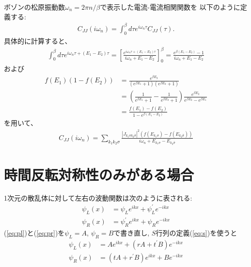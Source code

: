 \documentclass[10pt,a4j]{jarticle}
\begin{document}
ボゾンの松原振動数$\omega_n = 2\pi n/\beta$で表示した電流-電流相関関数を
以下のように定義する:
\begin{align}
C_{JJ}(i \omega_n) = \int_0^\beta d\tau e^{i\omega_n \tau} C_{JJ}(\tau). 
\end{align}
具体的に計算すると、
\begin{align}
\int_0^{\beta} d\tau e^{i\omega_n \tau + (E_1-E_2)\tau}
= \left[ \frac{e^{i\omega_n \tau + (E_1-E_2)\tau}}{i\omega_n + E_1-E_2} \right]_0^\beta
= \frac{e^{\beta (E_1-E_2)}-1}{i\omega_n + E_1-E_2}
\end{align}
および
\begin{align}
f(E_1) (1-f(E_2)) &= \frac{e^{\beta E_2}}{(e^{\beta E_1}+1)(e^{\beta E_2}+1)} \nonumber \\
&= \left(\frac{1}{e^{\beta E_1}+1} - \frac{1}{e^{\beta E_2}+1}\right) \frac{e^{\beta E_2}}{e^{\beta E_2} - e^{\beta E_1}}
\nonumber \\
&= \frac{f(E_1) - f(E_2)}{1-e^{\beta(E_1-E_2)}}
\end{align}
を用いて、
\begin{align}
C_{JJ}(i \omega_n) = \sum_{k_1 k_2 \sigma} 
\frac{|J_{k_1 \sigma k_2 \bar{\sigma}}|^2 (f(E_{k_1\sigma})-f(E_{k_2\bar{\sigma}}))}
{i\omega_n + E_{k_1\sigma} - E_{k_2 \bar{\sigma}}}
\end{align}

\newpage

\appendix

\section{時間反転対称性のみがある場合}

1次元の散乱体に対して左右の波動関数は次のように表される:
\begin{align}
\psi_L(x) &= \psi_L e^{ikx} + \psi^{\prime}_L e^{-ikx}  \label{eq:pl} \\
\psi_R(x) &= \psi^{\prime}_R e^{ikx} + \psi_R e^{-ikx} \label{eq:pr}
\end{align}
(\ref{eq:pl})と(\ref{eq:pr})を$\psi_L=A$, $\psi_R=B$で書き直し, $S$行列の定義(\ref{eq:s})を使うと
\begin{align}
\psi_L(x) &= Ae^{ikx} + (rA +t^{\prime}B)e^{-ikx}  \label{eq:pl2} \\
\psi_R(x) &= (tA + r^{\prime}B)e^{ikx} + Be^{-ikx} \label{eq:pr2}
\end{align}
\end{document}
